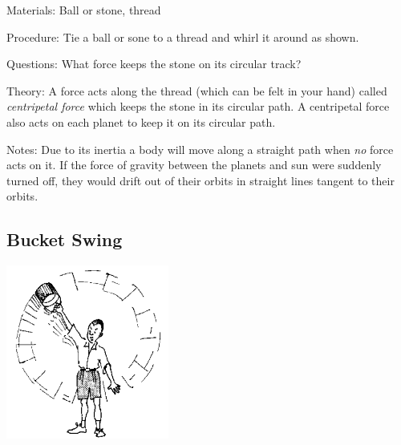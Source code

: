 \begin{multicols}{2}
\begin{description*}
\item[Materials:]{Ball or stone, thread}
\item[Procedure:]{Tie a ball or sone to a thread and whirl it around as shown.}
\item[Questions:]{What force keeps the stone on its circular track?}
\item[Theory:]{A force acts along the thread (which can be felt in your hand) called \emph{centripetal force} which keeps the stone in its circular path. A centripetal force also acts on each planet to keep it on its circular path.}
\item[Notes:]{Due to its inertia a body will move along a straight path when \emph{no} force acts on it. If the force of gravity between the planets and sun were suddenly turned off, they would drift out of their orbits in straight lines tangent to their orbits.}
\end{description*}

\subsection{Bucket Swing}

\begin{center}
\includegraphics[width=0.4\textwidth]{./img/source/bucket-swing.png}
\end{center}


\end{multicols}
